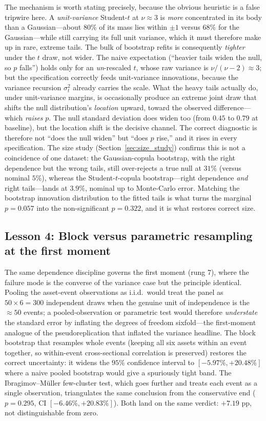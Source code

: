 \documentclass[pdflatex,sn-mathphys-num]{sn-jnl}
\theoremstyle{thmstyleone}
\theoremstyle{thmstyletwo}
\theoremstyle{thmstylethree}
\begin{document}
The mechanism is worth stating precisely, because the obvious heuristic is a false tripwire here. A \emph{unit-variance} Student-$t$ at $\nu\approx 3$ is \emph{more} concentrated in its body than a Gaussian---about $80\%$ of its mass lies within $\pm 1$ versus $68\%$ for the Gaussian---while still carrying its full unit variance, which it must therefore make up in rare, extreme tails. The bulk of bootstrap refits is consequently \emph{tighter} under the $t$ draw, not wider. The naive expectation (``heavier tails widen the null, so $p$ falls'') holds only for an \emph{un}-rescaled $t$, whose raw variance is $\nu/(\nu-2)\approx 3$; but the specification correctly feeds unit-variance innovations, because the variance recursion $\sigma^2_t$ already carries the scale. What the heavy tails actually do, under unit-variance margins, is occasionally produce an extreme joint draw that shifts the null distribution's \emph{location} upward, toward the observed difference---which \emph{raises} $p$. The null standard deviation does widen too (from $0.45$ to $0.79$ at baseline), but the location shift is the decisive channel. The correct diagnostic is therefore not ``does the null widen'' but ``does $p$ rise,'' and it rises in every specification. The size study (Section~\ref{sec:size_study}) confirms this is not a coincidence of one dataset: the Gaussian-copula bootstrap, with the right dependence but the wrong tails, still over-rejects a true null at $31\%$ (versus nominal $5\%$), whereas the Student-$t$-copula bootstrap---right dependence \emph{and} right tails---lands at $3.9\%$, nominal up to Monte-Carlo error. Matching the bootstrap innovation distribution to the fitted tails is what turns the marginal $p=0.057$ into the non-significant $p=0.322$, and it is what restores correct size.

\subsection{Lesson 4: Block versus parametric resampling at the first moment}\label{sec:lesson4}

The same dependence discipline governs the first moment (rung 7), where the failure mode is the converse of the variance case but the principle identical. Pooling the asset-event observations as i.i.d.\ would treat the panel as $50\times 6=300$ independent draws when the genuine unit of independence is the $\approx 50$ events; a pooled-observation or parametric test would therefore \emph{understate} the standard error by inflating the degrees of freedom sixfold---the first-moment analogue of the pseudoreplication that inflated the variance headline. The block bootstrap that resamples whole events (keeping all six assets within an event together, so within-event cross-sectional correlation is preserved) restores the correct uncertainty: it widens the $95\%$ confidence interval to $[-5.97\%, +20.48\%]$ where a naive pooled bootstrap would give a spuriously tight band. The Ibragimov--M\"uller few-cluster test, which goes further and treats each event as a single observation, triangulates the same conclusion from the conservative end ($p=0.295$, CI $[-6.46\%, +20.83\%]$). Both land on the same verdict: $+7.19$ pp, not distinguishable from zero.
\end{document}
